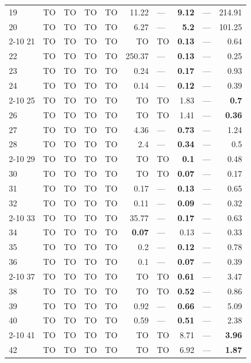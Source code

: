 \begin{longtable}{lr@{\hskip 4pt}l@{\hskip 12pt}r@{\hskip 4pt}l@{\hskip 12pt}r@{\hskip 4pt}l@{\hskip 12pt}r@{\hskip 4pt}l@{\hskip 12pt}r}
19 & TO & TO & TO & TO & 11.22 & --- & \textbf{9.12} & --- & 214.91 \\
20 & TO & TO & TO & TO & 6.27 & --- & \textbf{5.2} & --- & 101.25 \\
\cmidrule{2-10}
21 & TO & TO & TO & TO & TO & TO & \textbf{0.13} & --- & 0.64 \\
22 & TO & TO & TO & TO & 250.37 & --- & \textbf{0.13} & --- & 0.25 \\
23 & TO & TO & TO & TO & 0.24 & --- & \textbf{0.17} & --- & 0.93 \\
24 & TO & TO & TO & TO & 0.14 & --- & \textbf{0.12} & --- & 0.39 \\
\cmidrule{2-10}
25 & TO & TO & TO & TO & TO & TO & 1.83 & --- & \textbf{0.7} \\
26 & TO & TO & TO & TO & TO & TO & 1.41 & --- & \textbf{0.36} \\
27 & TO & TO & TO & TO & 4.36 & --- & \textbf{0.73} & --- & 1.24 \\
28 & TO & TO & TO & TO & 2.4 & --- & \textbf{0.34} & --- & 0.5 \\
\cmidrule{2-10}
29 & TO & TO & TO & TO & TO & TO & \textbf{0.1} & --- & 0.48 \\
30 & TO & TO & TO & TO & TO & TO & \textbf{0.07} & --- & 0.17 \\
31 & TO & TO & TO & TO & 0.17 & --- & \textbf{0.13} & --- & 0.65 \\
32 & TO & TO & TO & TO & 0.11 & --- & \textbf{0.09} & --- & 0.32 \\
\cmidrule{2-10}
33 & TO & TO & TO & TO & 35.77 & --- & \textbf{0.17} & --- & 0.63 \\
34 & TO & TO & TO & TO & \textbf{0.07} & --- & 0.13 & --- & 0.33 \\
35 & TO & TO & TO & TO & 0.2 & --- & \textbf{0.12} & --- & 0.78 \\
36 & TO & TO & TO & TO & 0.1 & --- & \textbf{0.07} & --- & 0.39 \\
\cmidrule{2-10}
37 & TO & TO & TO & TO & TO & TO & \textbf{0.61} & --- & 3.47 \\
38 & TO & TO & TO & TO & TO & TO & \textbf{0.52} & --- & 0.86 \\
39 & TO & TO & TO & TO & 0.92 & --- & \textbf{0.66} & --- & 5.09 \\
40 & TO & TO & TO & TO & 0.59 & --- & \textbf{0.51} & --- & 2.38 \\
\cmidrule{2-10}
41 & TO & TO & TO & TO & TO & TO & 8.71 & --- & \textbf{3.96} \\
42 & TO & TO & TO & TO & TO & TO & 6.92 & --- & \textbf{1.87} \\

\end{longtable}
